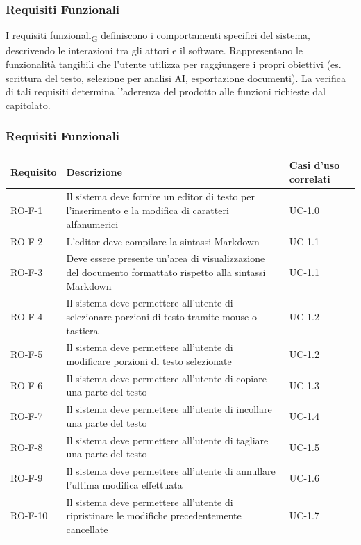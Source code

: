 \documentclass[11pt,a4paper]{article}
\begin{document}
\subsubsection{Requisiti Funzionali}
I requisiti funzionali\textsubscript{G} definiscono i comportamenti specifici del sistema, descrivendo le interazioni tra gli attori e il software.
Rappresentano le funzionalità tangibili che l'utente utilizza per raggiungere i propri obiettivi (es. scrittura del testo, selezione per analisi AI, esportazione documenti). La verifica di tali requisiti determina l'aderenza del prodotto alle funzioni richieste dal capitolato.

\subsubsection{Requisiti Funzionali}
\begin{longtable}{|p{}|>{\raggedright\arraybackslash}p{}|p{}|}
\hline
\textbf{Requisito} & \textbf{Descrizione} & \textbf{Casi d'uso correlati}\\
\hline
\endhead
RO-F-1 & Il sistema deve fornire un editor di testo per l'inserimento e la modifica di caratteri alfanumerici & UC-1.0 \\
\hline
RO-F-2 & L'editor deve compilare la sintassi Markdown & UC-1.1 \\
\hline
RO-F-3 & Deve essere presente un'area di visualizzazione del documento formattato rispetto alla sintassi Markdown & UC-1.1 \\
\hline
RO-F-4 & Il sistema deve permettere all'utente di selezionare porzioni di testo tramite mouse o tastiera & UC-1.2 \\
\hline
RO-F-5 & Il sistema deve permettere all'utente di modificare porzioni di testo selezionate & UC-1.2 \\
\hline
RO-F-6 & Il sistema deve permettere all'utente di copiare una parte del testo & UC-1.3 \\
\hline
RO-F-7 & Il sistema deve permettere all'utente di incollare una parte del testo & UC-1.4 \\
\hline
RO-F-8 & Il sistema deve permettere all'utente di tagliare una parte del testo & UC-1.5 \\
\hline
RO-F-9 & Il sistema deve permettere all'utente di annullare l'ultima modifica effettuata & UC-1.6 \\
\hline
RO-F-10 & Il sistema deve permettere all'utente di ripristinare le modifiche precedentemente cancellate & UC-1.7 \\

\end{longtable}
\end{document}
